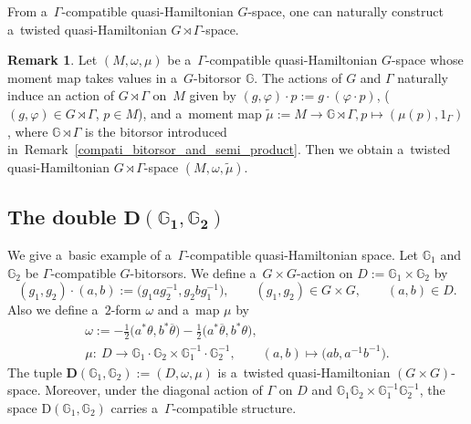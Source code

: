 \documentclass[10pt,a4paper]{amsart}
\numberwithin{equation}{section}
\theoremstyle{definition}
\newtheorem{Remark}[Theorem]{Remark}
\newcommand{\bG}{\mathbb{G}}
\begin{document}
From a~$\Gamma$-compatible quasi-Hamiltonian $G$-space, one can naturally construct a~twisted quasi-Hamiltonian $G \rtimes \Gamma$-space.
\begin{Remark}\label{cpti_q-Ham_and_twisted_q-Ham}
 Let $(M,\omega,\mu)$ be a~$\Gamma$-compatible quasi-Hamiltonian $G$-space whose moment map takes values in a~$G$-bitorsor $\bG$.
 The actions of $G$ and $\Gamma$ naturally induce an action of $G \rtimes \Gamma$ on~$M$ given by $(g,\varphi) \cdot p := g \cdot (\varphi \cdot p) $, ($(g,\varphi) \in G \rtimes \Gamma$, $ p \in M$),
 and a~moment map $\tilde{\mu} := M \to \bG \rtimes \Gamma, p \mapsto (\mu(p),1_{\Gamma})$,
 where $\bG \rtimes \Gamma$ is the bitorsor introduced in~Remark~\ref{compati_bitorsor_and_semi_product}.
 Then we obtain a~twisted quasi-Hamiltonian $G \rtimes \Gamma$-space $(M,\omega,\tilde{\mu})$.
\end{Remark}

\subsection[The double D(G\_1,G\_2)]{The double $\boldsymbol{\text{D}(\bG_1,\bG_2)}$}\label{the_double}

We give a~basic example of a~$\Gamma$-compatible quasi-Hamiltonian space.
Let $\bG_1$ and $\bG_2$ be $\Gamma$-compatible $G$-bitorsors.
We define a~$G \times G$-action on $D := \bG_1 \times \bG_2$ by
\[ (g_1, g_2) \cdot (a,b) := \bigl(g_1 a g_2^{-1}, g_2 b g_1^{-1}\bigr), \qquad (g_1,g_2) \in G \times G,\qquad (a,b) \in D.\]
Also we define a~$2$-form $\omega$ and a~map $\mu$ by
\begin{gather*}
 \omega := -\frac{1}{2}\bigl(a^* \theta, b^* \overline{\theta}\bigr)-\frac{1}{2}\bigl(a^*\overline{\theta},b^*\theta\bigr),\\
 \mu \colon \ D \to \bG_1\cdot \bG_2 \times \bG_1^{-1} \cdot \bG_2^{-1},\qquad
(a,b) \mapsto \bigl(ab, a^{-1}b^{-1}\bigr).
\end{gather*}
The tuple $\textbf{D}(\bG_1,\bG_2) := (D,\omega, \mu)$ is a~twisted quasi-Hamiltonian $(G\times G)$-space.
Moreover, under the diagonal action of $\Gamma$ on $D$ and $\bG_1\bG_2 \times \bG_1^{-1}\bG_2^{-1}$, the space $\text{D}(\bG_1,\bG_2)$ carries a~$\Gamma$-compatible structure.
\end{document}

